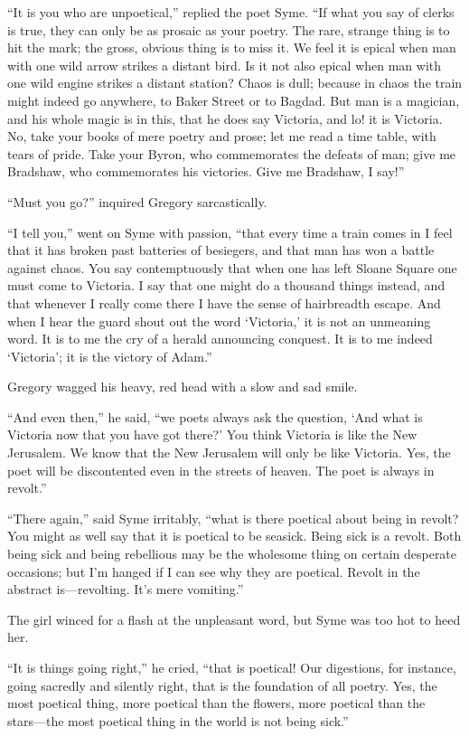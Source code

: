 “It is you who are unpoetical,” replied the poet Syme. “If what you say of clerks is true, they can only be as prosaic as your poetry. The rare, strange thing is to hit the mark; the gross, obvious thing is to miss it. We feel it is epical when man with one wild arrow strikes a distant bird. Is it not also epical when man with one wild engine strikes a distant station? Chaos is dull; because in chaos the train might indeed go anywhere, to Baker Street or to Bagdad. But man is a magician, and his whole magic is in this, that he does say Victoria, and lo! it is Victoria. No, take your books of mere poetry and prose; let me read a time table, with tears of pride. Take your Byron, who commemorates the defeats of man; give me Bradshaw, who commemorates his victories. Give me Bradshaw, I say!”

“Must you go?” inquired Gregory sarcastically.

“I tell you,” went on Syme with passion, “that every time a train comes in I feel that it has broken past batteries of besiegers, and that man has won a battle against chaos. You say contemptuously that when one has left Sloane Square one must come to Victoria. I say that one might do a thousand things instead, and that whenever I really come there I have the sense of hairbreadth escape. And when I hear the guard shout out the word ‘Victoria,’ it is not an unmeaning word. It is to me the cry of a herald announcing conquest. It is to me indeed ‘Victoria’; it is the victory of Adam.”

Gregory wagged his heavy, red head with a slow and sad smile.

“And even then,” he said, “we poets always ask the question, ‘And what is Victoria now that you have got there?’ You think Victoria is like the New Jerusalem. We know that the New Jerusalem will only be like Victoria. Yes, the poet will be discontented even in the streets of heaven. The poet is always in revolt.”

“There again,” said Syme irritably, “what is there poetical about being in revolt? You might as well say that it is poetical to be seasick. Being sick is a revolt. Both being sick and being rebellious may be the wholesome thing on certain desperate occasions; but I’m hanged if I can see why they are poetical. Revolt in the abstract is⁠—revolting. It’s mere vomiting.”

The girl winced for a flash at the unpleasant word, but Syme was too hot to heed her.

“It is things going right,” he cried, “that is poetical! Our digestions, for instance, going sacredly and silently right, that is the foundation of all poetry. Yes, the most poetical thing, more poetical than the flowers, more poetical than the stars⁠—the most poetical thing in the world is not being sick.”

